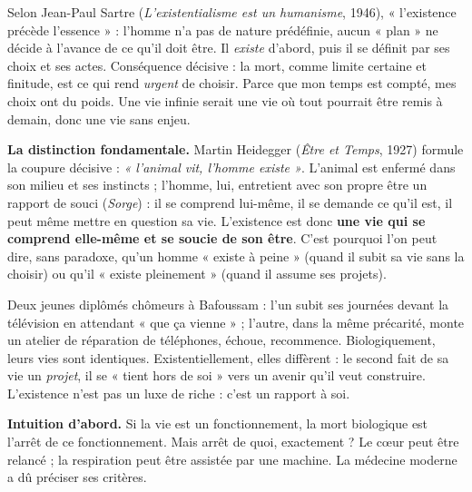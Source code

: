 \documentclass[11pt]{article}
\newcommand{\cle}[1]{{\popxbold\color{popdark}#1}}
\newcounter{popsec}
\newcounter{popsub}
\newcommand{\courssub}[1]{%
  \stepcounter{popsub}%
  \par\vspace{9pt}\noindent{\popxbold\fontsize{11.5}{13}\selectfont\color{popink}{\color{poporange}\thepopsec.\thepopsub}\hspace{6pt}#1}\par\nopagebreak\vspace{4pt}
}
\begin{document}
\begin{propriete}
Selon Jean-Paul Sartre (\emph{L'existentialisme est un humanisme}, 1946), « l'existence précède l'essence » : l'homme n'a pas de nature prédéfinie, aucun « plan » ne décide à l'avance de ce qu'il doit être. Il \emph{existe} d'abord, puis il se définit par ses choix et ses actes. Conséquence décisive : la mort, comme limite certaine et finitude, est ce qui rend \emph{urgent} de choisir. Parce que mon temps est compté, mes choix ont du poids. Une vie infinie serait une vie où tout pourrait être remis à demain, donc une vie sans enjeu.
\end{propriete}

\textbf{La distinction fondamentale.} Martin Heidegger (\emph{Être et Temps}, 1927) formule la coupure décisive : \emph{« l'animal vit, l'homme existe »}. L'animal est enfermé dans son milieu et ses instincts ; l'homme, lui, entretient avec son propre être un rapport de \cle{souci} (\emph{Sorge}) : il se comprend lui-même, il se demande ce qu'il est, il peut même mettre en question sa vie. L'existence est donc \textbf{une vie qui se comprend elle-même et se soucie de son être}. C'est pourquoi l'on peut dire, sans paradoxe, qu'un homme « existe à peine » (quand il subit sa vie sans la choisir) ou qu'il « existe pleinement » (quand il assume ses projets).

\begin{exemplebox}
Deux jeunes diplômés chômeurs à Bafoussam : l'un subit ses journées devant la télévision en attendant « que ça vienne » ; l'autre, dans la même précarité, monte un atelier de réparation de téléphones, échoue, recommence. Biologiquement, leurs vies sont identiques. Existentiellement, elles diffèrent : le second fait de sa vie un \emph{projet}, il se « tient hors de soi » vers un avenir qu'il veut construire. L'existence n'est pas un luxe de riche : c'est un rapport à soi.
\end{exemplebox}

\courssub{La mort biologique : critères cliniques}

\textbf{Intuition d'abord.} Si la vie est un fonctionnement, la mort biologique est l'arrêt de ce fonctionnement. Mais arrêt de quoi, exactement ? Le cœur peut être relancé ; la respiration peut être assistée par une machine. La médecine moderne a dû préciser ses critères.
\end{document}
